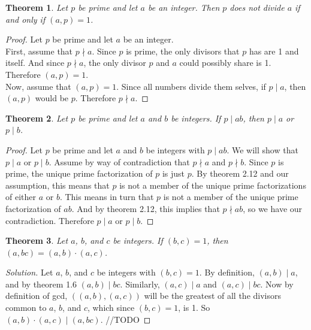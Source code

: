 \documentclass[12pt,leqno]{article}
\numberwithin{equation}{section}
\newtheorem{thm}{Theorem}[section]
\theoremstyle{definition}
\begin{document}

\begin{thm}
Let $p$ be prime and let $a$ be an integer.  Then $p$ does not divide $a$ if and only if $(a, p) = 1$.
\end{thm}

\begin{proof}[Proof]
Let $p$ be prime and let $a$ be an integer.\\
First, assume that $p \nmid a$.  Since $p$ is prime, the only divisors that $p$ has are 1 and itself.  And since $p \nmid a$, the only divisor $p$ and $a$ could possibly share is 1.  Therefore $(a, p) = 1$.\\
Now, assume that $(a, p) = 1$.  Since all numbers divide them selves, if $p \mid a$, then $(a, p)$ would be $p$.  Therefore $p \nmid a$.
\end{proof}

\pagebreak

\begin{thm}
Let $p$ be prime and let $a$ and $b$ be integers. If $p \mid ab$, then $p\mid a$ or $p \mid b$.
\end{thm}

\begin{proof}[Proof]
Let $p$ be prime and let $a$ and $b$ be integers with $p \mid ab$. We will show that $p\mid a$ or $p \mid b$. Assume by way of contradiction that $p\nmid a$ and $p \nmid b$.  Since $p$ is prime, the unique prime factorization of $p$ is just $p$.  By theorem 2.12 and our assumption, this means that $p$ is not a member of the unique prime factorizations of either $a$ or $b$.  This means in turn that $p$ is not a member of the unique prime factorization of $ab$.  And by theorem 2.12, this implies that $p \nmid ab$, so we have our contradiction.  Therefore $p\mid a$ or $p \mid b$.
\end{proof}


\begin{thm}
Let $a$, $b$, and $c$ be integers.  If $(b, c) = 1$, then $(a, bc) = (a, b) \cdot (a, c)$.
\end{thm}

\begin{proof}[Solution]
Let $a$, $b$, and $c$ be integers with $(b, c) = 1$.  By definition, $(a, b) \mid a$, and by theorem 1.6 $(a, b) \mid bc$.  Similarly, $(a, c) \mid a$ and $(a, c) \mid bc$.  Now by definition of gcd, $((a, b), (a, c))$ will be the greatest of all the divisors common to $a$, $b$, and $c$, which since $(b, c) = 1$, is 1.  So $(a, b) \cdot (a, c) \mid (a, bc)$. //TODO
\end{proof}
\end{document}
